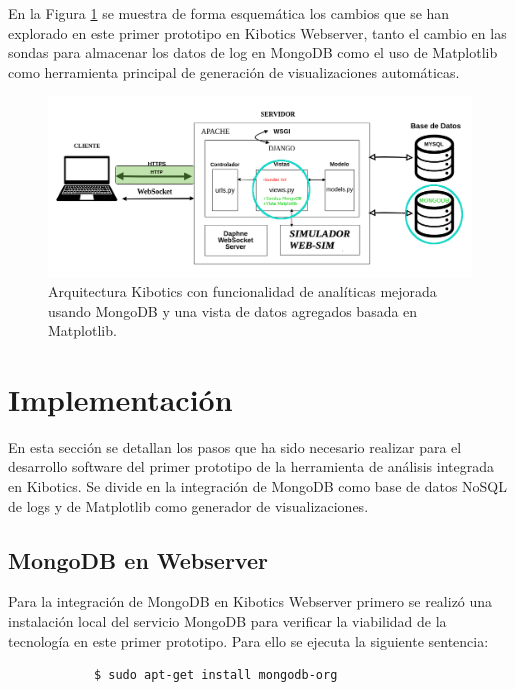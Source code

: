 \documentclass[a4paper, 12pt]{book}
\begin{document}
		En la Figura \ref{fig:arquitectura_kibotics_1} se muestra de forma esquemática los cambios que se han explorado en este primer prototipo en Kibotics Webserver, tanto el cambio en las sondas para almacenar los datos de log en MongoDB como el uso de Matplotlib como herramienta principal de generación de visualizaciones automáticas.

		\begin{figure}[H]
			\centering
			\includegraphics[width=15cm, keepaspectratio]{img/esquema_Kibotics_1.png}
			\caption{Arquitectura Kibotics con funcionalidad de analíticas mejorada usando MongoDB y una vista de datos agregados basada en Matplotlib.}
			\label{fig:arquitectura_kibotics_1}
		\end{figure}

	
	\section{Implementación} 
	\label{sec:1_implementacion} 
		En esta sección se detallan los pasos que ha sido necesario realizar para el desarrollo software del primer prototipo de la herramienta de análisis integrada en Kibotics. Se divide en la integración de MongoDB como base de datos NoSQL de logs y de Matplotlib como generador de visualizaciones. 
		
	\subsection{MongoDB en Webserver}
	\label{subsec:mongodb_kibotics}
		Para la integración de MongoDB en Kibotics Webserver primero se realizó una instalación local del servicio MongoDB para verificar la viabilidad de la tecnología en este primer prototipo. Para ello se ejecuta la siguiente sentencia:
		
		{\footnotesize
		\begin{verbatim}
			$ sudo apt-get install mongodb-org
		\end{verbatim}
		}
		
\end{document}
